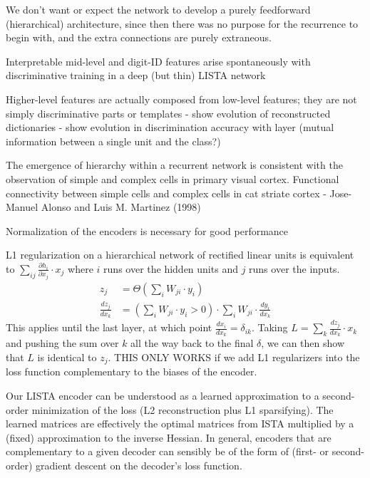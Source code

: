 We don't want or expect the network to develop a purely feedforward (hierarchical) architecture, since then there was no purpose for the recurrence to begin with, and the extra connections are purely extraneous.

Interpretable mid-level and digit-ID features arise spontaneously with discriminative training in a deep (but thin) LISTA network

Higher-level features are actually composed from low-level features; they are not simply discriminative parts or templates
  - show evolution of reconstructed dictionaries
  - show evolution in discrimination accuracy with layer (mutual information between a single unit and the class?)

The emergence of hierarchy within a recurrent network is consistent with the observation of simple and complex cells in primary visual cortex.  
Functional connectivity between simple cells and complex cells in cat striate cortex - Jose-Manuel Alonso and Luis M. Martinez (1998)

Normalization of the encoders is necessary for good performance

L1 regularization on a hierarchical network of rectified linear units is equivalent to $\sum_{ij} \frac{\partial h_i}{\partial x_j} \cdot x_j$ where $i$ runs over the hidden units and $j$ runs over the inputs.  
\begin{align*}
z_j &= \Theta\left(\sum_i W_{ji} \cdot y_i \right) \\
\frac{d z_j}{d x_k} &= \left( \sum_i W_{ji} \cdot y_i > 0 \right) \cdot \sum_i W_{ji} \cdot \frac{d y_i}{d x_k} 
\end{align*}
This applies until the last layer, at which point $\frac{d x_i}{d x_k} = \delta_{ik}$.  Taking $L = \sum_k \frac{d z_j}{d x_k} \cdot x_k$ and pushing the sum over $k$ all the way back to the final $\delta$, we can then show that $L$ is identical to $z_j$.  THIS ONLY WORKS if we add L1 regularizers into the loss function complementary to the biases of the encoder.

Our LISTA encoder can be understood as a learned approximation to a second-order minimization of the loss (L2 reconstruction plus L1 sparsifying).  The learned matrices are effectively the optimal matrices from ISTA multiplied by a (fixed) approximation to the inverse Hessian.  In general, encoders that are complementary to a given decoder can sensibly be of the form of (first- or second-order) gradient descent on the decoder's loss function. 



